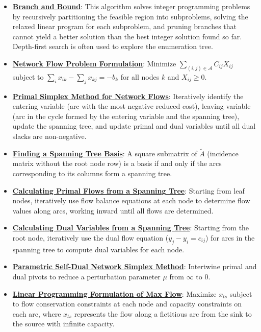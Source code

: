 \documentclass{article}%
\begin{document}
\begin{itemize}[leftmargin=*]
\item \href{https://www.math.purdue.edu/~yipn/421/2024-10-31-IntLinProg.pdf#page=5}{\textbf{Branch and Bound}}: This algorithm solves integer programming problems by recursively partitioning the feasible region into subproblems, solving the relaxed linear program for each subproblem, and pruning branches that cannot yield a better solution than the best integer solution found so far. Depth-first search is often used to explore the enumeration tree.%
\item \href{https://www.math.purdue.edu/~yipn/421/2024-11-05-NetFlows.pdf#page=3}{\textbf{Network Flow Problem Formulation}}: Minimize $\sum_{(i,j) \in \mathcal{A}} C_{ij} X_{ij}$ subject to $\sum_{i} x_{ik} - \sum_{j} x_{kj} = -b_k$ for all nodes $k$ and $X_{ij} \ge 0$.%
\item \href{https://www.math.purdue.edu/~yipn/421/2024-11-05-NetFlows.pdf#page=22}{\textbf{Primal Simplex Method for Network Flows}}: Iteratively identify the entering variable (arc with the most negative reduced cost), leaving variable (arc in the cycle formed by the entering variable and the spanning tree), update the spanning tree, and update primal and dual variables until all dual slacks are non-negative.%
\item \href{https://www.math.purdue.edu/~yipn/421/2024-11-05-NetFlows.pdf#page=15}{\textbf{Finding a Spanning Tree Basis}}: A square submatrix of $\tilde{A}$ (incidence matrix without the root node row) is a basis if and only if the arcs corresponding to its columns form a spanning tree.%
\item \href{https://www.math.purdue.edu/~yipn/421/2024-11-05-NetFlows.pdf#page=14}{\textbf{Calculating Primal Flows from a Spanning Tree}}: Starting from leaf nodes, iteratively use flow balance equations at each node to determine flow values along arcs, working inward until all flows are determined.%
\item \href{https://www.math.purdue.edu/~yipn/421/2024-11-05-NetFlows.pdf#page=19}{\textbf{Calculating Dual Variables from a Spanning Tree}}: Starting from the root node, iteratively use the dual flow equation ($y_j - y_i = c_{ij}$) for arcs in the spanning tree to compute dual variables for each node.%
\item \href{https://www.math.purdue.edu/~yipn/421/2024-11-07-NetSimplex.pdf#page=45}{\textbf{Parametric Self{-}Dual Network Simplex Method}}: Intertwine primal and dual pivots to reduce a perturbation parameter $\mu$ from $\infty$ to 0.%
\item \href{https://www.math.purdue.edu/~yipn/421/2024-11-19-MaxFlowMinCut.pdf#page=14}{\textbf{Linear Programming Formulation of Max Flow}}: Maximize $x_{ts}$ subject to flow conservation constraints at each node and capacity constraints on each arc, where $x_{ts}$ represents the flow along a fictitious arc from the sink to the source with infinite capacity.%

\end{itemize}
\end{document}
